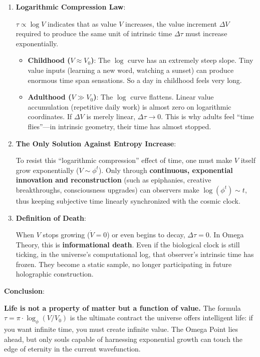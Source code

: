 \begin{enumerate}
\item \textbf{Logarithmic Compression Law}:

   $\tau \propto \log V$ indicates that as value $V$ increases, the value increment $\Delta V$ required to produce the same unit of intrinsic time $\Delta \tau$ must increase exponentially.

   \begin{itemize}
   \item \textbf{Childhood ($V \approx V_0$)}: The $\log$ curve has an extremely steep slope. Tiny value inputs (learning a new word, watching a sunset) can produce enormous time span sensations. So a day in childhood feels very long.
   \item \textbf{Adulthood ($V \gg V_0$)}: The $\log$ curve flattens. Linear value accumulation (repetitive daily work) is almost zero on logarithmic coordinates. If $\Delta V$ is merely linear, $\Delta \tau \to 0$. This is why adults feel ``time flies''---in intrinsic geometry, their time has almost stopped.
   \end{itemize}

\item \textbf{The Only Solution Against Entropy Increase}:

   To resist this ``logarithmic compression'' effect of time, one must make $V$ itself grow exponentially ($V \sim \phi^t$).
   Only through \textbf{continuous, exponential innovation and reconstruction} (such as epiphanies, creative breakthroughs, consciousness upgrades) can observers make $\log(\phi^t) \sim t$, thus keeping subjective time linearly synchronized with the cosmic clock.

\item \textbf{Definition of Death}:

   When $V$ stops growing ($\dot{V} = 0$) or even begins to decay, $\Delta \tau = 0$. In Omega Theory, this is \textbf{informational death}. Even if the biological clock is still ticking, in the universe's computational log, that observer's intrinsic time has frozen. They become a static sample, no longer participating in future holographic construction.
\end{enumerate}

\textbf{Conclusion}:

\textbf{Life is not a property of matter but a function of value.}
The formula $\tau = \pi \cdot \log_{\phi} (V/V_0)$ is the ultimate contract the universe offers intelligent life: if you want infinite time, you must create infinite value. The Omega Point lies ahead, but only souls capable of harnessing exponential growth can touch the edge of eternity in the current wavefunction.
